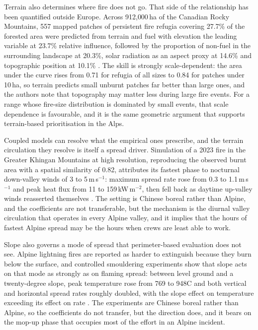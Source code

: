 \documentclass[11pt,a4paper]{article}
\begin{document}
Terrain also determines where fire does not go. That side of the relationship has been quantified outside Europe. Across 912{,}000\,ha of the Canadian Rocky Mountains, 557 mapped patches of persistent fire refugia covering 27.7\% of the forested area were predicted from terrain and fuel with elevation the leading variable at 23.7\% relative influence, followed by the proportion of non-fuel in the surrounding landscape at 20.3\%, solar radiation as an aspect proxy at 14.6\% and topographic position at 10.1\% \citep{rogeau_effect_2018}. The skill is strongly scale-dependent: the area under the curve rises from 0.71 for refugia of all sizes to 0.84 for patches under 10\,ha, so terrain predicts small unburnt patches far better than large ones, and the authors note that topography may matter less during large fire events. For a range whose fire-size distribution is dominated by small events, that scale dependence is favourable, and it is the same geometric argument that supports terrain-based prioritisation in the Alps.

Coupled models can resolve what the empirical ones prescribe, and the terrain circulation they resolve is itself a spread driver. Simulation of a 2023 fire in the Greater Khingan Mountains at high resolution, reproducing the observed burnt area with a spatial similarity of 0.82, attributes its fastest phase to nocturnal down-valley winds of 3 to 5\,m\,s$^{-1}$: maximum spread rate rose from 0.3 to 1.1\,m\,s$^{-1}$ and peak heat flux from 11 to 159\,kW\,m$^{-2}$, then fell back as daytime up-valley winds reasserted themselves \citep{wang_dynamic_2026}. The setting is Chinese boreal rather than Alpine, and the coefficients are not transferable, but the mechanism is the diurnal valley circulation that operates in every Alpine valley, and it implies that the hours of fastest Alpine spread may be the hours when crews are least able to work.

Slope also governs a mode of spread that perimeter-based evaluation does not see. Alpine lightning fires are reported as harder to extinguish because they burn below the surface, and controlled smouldering experiments show that slope acts on that mode as strongly as on flaming spread: between level ground and a twenty-degree slope, peak temperature rose from 769 to 948\degree{}C and both vertical and horizontal spread rates roughly doubled, with the slope effect on temperature exceeding its effect on rate \citep{shan_influence_2024}. The experiments are Chinese boreal rather than Alpine, so the coefficients do not transfer, but the direction does, and it bears on the mop-up phase that occupies most of the effort in an Alpine incident.
\end{document}
